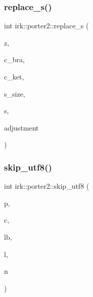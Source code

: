 \mbox{\label{namespaceirk_1_1porter2_a9d454cff8072863d1dc4e207c7dcd3cc}} 
\subsubsection{\texorpdfstring{replace\+\_\+s()}{replace\_s()}}
{\footnotesize\ttfamily int irk\+::porter2\+::replace\+\_\+s (\begin{DoxyParamCaption}\item[{struct \mbox{\hyperlink{structirk_1_1porter2_1_1SN__env}{S\+N\+\_\+env}} $\ast$}]{z,  }\item[{int}]{c\+\_\+bra,  }\item[{int}]{c\+\_\+ket,  }\item[{int}]{s\+\_\+size,  }\item[{const \mbox{\hyperlink{namespaceirk_1_1porter2_afd04c4eb58a1dabcf8f3ab2d7e9f9ed5}{symbol}} $\ast$}]{s,  }\item[{int $\ast$}]{adjustment }\end{DoxyParamCaption})}

\mbox{\label{namespaceirk_1_1porter2_a2360f26767fbaa0a3d9a1b27da2a5685}} 
\subsubsection{\texorpdfstring{skip\+\_\+utf8()}{skip\_utf8()}}
{\footnotesize\ttfamily int irk\+::porter2\+::skip\+\_\+utf8 (\begin{DoxyParamCaption}\item[{const \mbox{\hyperlink{namespaceirk_1_1porter2_afd04c4eb58a1dabcf8f3ab2d7e9f9ed5}{symbol}} $\ast$}]{p,  }\item[{int}]{c,  }\item[{int}]{lb,  }\item[{int}]{l,  }\item[{int}]{n }\end{DoxyParamCaption})}

\mbox{\label{namespaceirk_1_1porter2_a321ee286179634f1bf3743529a7443e0}} 
